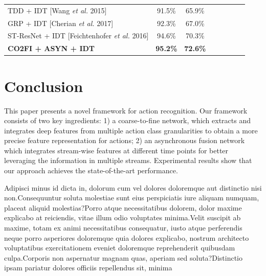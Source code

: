 \documentclass[letterpaper]{article} %
\begin{document}
\begin{table}
{\begin{tabular}{|p{5.3cm}|c|*{5}{c|}c}
TDD + IDT [Wang \emph{et al.} 2015]&  91.5\%& 65.9\%\\
GRP + IDT [Cherian \emph{et al.} 2017]&  92.3\%& 67.0\%\\
ST-ResNet + IDT [Feichtenhofer \emph{et al.} 2016]&  94.6\%& 70.3\%\\
{\bf CO2FI + ASYN + IDT}& {\bf 95.2\%}& {\bf 72.6\%}  \\
\hline
\end{tabular}}
\end{table}





\section{Conclusion\label{section:conclusion}}


This paper presents a novel framework for action recognition. Our framework consists of two key ingredients: 1) a coarse-to-fine network, which extracts and integrates deep features from multiple action class
granularities to obtain a more precise feature representation for actions; 2) an asynchronous fusion network which integrates stream-wise features at different time points
for better leveraging the information in multiple streams.
Experimental results show that our approach achieves the state-of-the-art performance.



Adipisci minus id dicta in, dolorum cum vel dolores doloremque aut distinctio nisi non.Consequuntur soluta molestiae sunt eius perspiciatis iure aliquam numquam, placeat aliquid molestias?Porro atque necessitatibus dolorem, dolor maxime explicabo at reiciendis, vitae illum odio voluptates minima.Velit suscipit ab maxime, totam ex animi necessitatibus consequatur, iusto atque perferendis neque porro asperiores doloremque quia dolores explicabo, nostrum architecto voluptatibus exercitationem eveniet doloremque reprehenderit quibusdam culpa.Corporis non aspernatur magnam quas, aperiam sed soluta?Distinctio ipsam pariatur dolores officiis repellendus sit, minima


\end{document}
